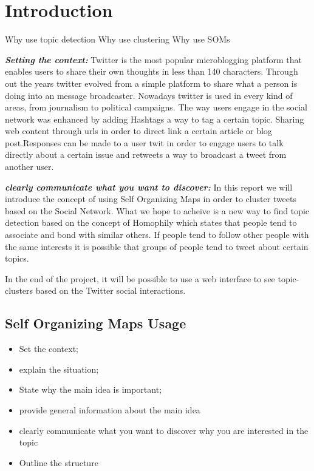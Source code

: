 \section{Introduction}

Why use topic detection
Why use clustering
Why use SOMs

\textit{ \textbf{Setting the context:}} 
Twitter is the most popular microblogging platform that enables users to share their own thoughts in less than 140 characters. Through out the years twitter evolved from a simple platform to share what a person is doing into an message broadcaster. Nowadays twitter is used in every kind of areas, from journalism to political campaigns. 
The way users engage in the social network was enhanced by adding Hashtags a way to tag a certain topic. Sharing web content through urls in order to direct link a certain article or blog post.Responses can be made to a user twit in order to engage users to talk directly about a certain issue and retweets a way to broadcast a tweet from another user.

\textit{ \textbf{clearly communicate what you want to discover:}} 
In this report we will introduce the concept of using Self Organizing Maps in order to cluster tweets based on the Social Network. What we hope to acheive is a new way to find topic detection based on the concept of Homophily which states that people tend to associate and bond with similar others. If people tend to follow other people with the same interests it is possible that groups of people tend to tweet about certain topics.

In the end of the project, it will be possible to use a web interface to see topic-clusters based on the Twitter social interactions.

\subsection{Self Organizing Maps Usage} %
\label{sub:self_organizing_maps_usage}



\begin{itemize}
  \settowidth{\leftmargin}{{\Large$\square$}}\advance\leftmargin{}
  
  \renewcommand\labelitemi{{\lower1.5pt\hbox{\Large$\square$}}}
  \item Set the context; 
  \item explain the situation;
  \item State why the main idea is important;  
  \item provide general information about the main idea
  \item clearly communicate what you want to discover why you are interested in the topic
  \item Outline the structure 
\end{itemize}
